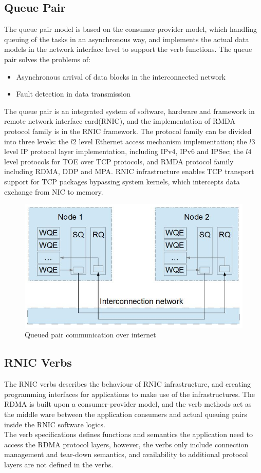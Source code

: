 \documentclass[11pt,openright,a4paper]{report}
\begin{document}
\subsection{Queue Pair}
The queue pair model is based on the consumer-provider model, which handling queuing of the tasks in an asynchronous way, and implements the actual data models in the network interface level to support the verb functions\cite{garcia2006binding}. The queue pair solves the problems of:
\begin{itemize}
\item Asynchronous arrival of data blocks in the interconnected network
\item Fault detection in data transmission
\end{itemize}
The queue pair is an integrated system of software, hardware and framework in remote network interface card(RNIC), and the implementation of RMDA protocol family is in the RNIC framework. The protocol family can be divided into three levels: the \(l2\) level Ethernet access mechanism implementation; the \(l3\) level IP protocol layer implementation, including IPv4, IPv6 and IPSec; the \(l4\) level protocols for TOE over TCP protocols, and RMDA protocol family including RDMA, DDP and MPA\cite{arndt2003infiniband}. RNIC infrastructure enables TCP transport support for TCP packages bypassing system kernels, which intercepts data exchange from NIC to memory. \\ 
\begin{figure}[H]
	\centering
    \includegraphics[width=0.6\linewidth]{picture/queuepair.JPG}
    \caption{Queued pair communication over internet}
    \label{fig:queuedpair}
\end{figure}
\subsection{RNIC Verbs}
The RNIC verbs describes the behaviour of RNIC infrastructure, and creating programming interfaces for applications to make use of the infrastructures\cite{hilland2003rdma}.  The RDMA is built upon a consumer-provider model, and the verb methods act as the middle ware between the application consumers and actual queuing pairs inside the RNIC software logics\cite{krause2008method}.\\ 
The verb specifications defines functions and semantics the application need to access the RDMA protocol layers, however, the verbs only include connection management and tear-down semantics, and availability to additional protocol layers  are not defined in the verbs.\\ 
\end{document}
